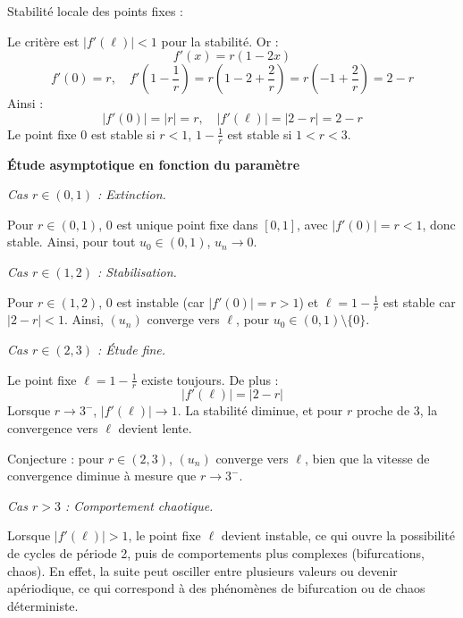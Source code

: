 \documentclass[10pt,a4paper]{article}
\begin{document}
\q Stabilité locale des points fixes :

Le critère est \( |f'(\ell)| < 1 \) pour la stabilité. Or :
\[
f'(x) = r (1 - 2x)
\]
\[
f'(0) = r, \quad f'\left(1 - \frac{1}{r}\right) = r \left(1 - 2 + \frac{2}{r}\right) = r \left( -1 + \frac{2}{r} \right) = 2 - r
\]
Ainsi :
\[
|f'(0)| = |r| = r, \quad |f'(\ell)| = |2 - r| = 2 - r
\]
Le point fixe \( 0 \) est stable si \( r < 1 \), \( 1 - \frac{1}{r} \) est stable si \( 1 < r < 3
\).

\bigskip
\textbf{Étude asymptotique en fonction du paramètre}

\textit{Cas \( r \in (0,1) \) : Extinction.}

\q Pour \( r \in (0,1) \), \( 0 \) est unique point fixe dans \( [0,1] \), avec \( |f'(0)| = r < 1
\), donc stable. Ainsi, pour tout \( u_0 \in (0,1) \), \( u_n \to 0 \).


\textit{Cas \( r \in (1,2) \) : Stabilisation.}

\q Pour \( r \in (1,2) \), \( 0 \) est instable (car \( |f'(0)| = r > 1 \)) et \( \ell = 1 -
\frac{1}{r} \) est stable car \( |2 - r| < 1 \). Ainsi, \( (u_n) \) converge vers \( \ell \), pour
\( u_0 \in (0,1) \setminus \{0\} \).


\textit{Cas \( r \in (2,3) \) : Étude fine.}

\q Le point fixe \( \ell = 1 - \frac{1}{r} \) existe toujours. De plus :
\[
|f'(\ell)| = |2 - r|
\]
Lorsque \( r \to 3^- \), \( |f'(\ell)| \to 1 \). La stabilité diminue, et pour \( r \) proche de 3,
la convergence vers \( \ell \) devient lente.

\q Conjecture : pour \( r \in (2,3) \), \( (u_n) \) converge vers \( \ell \), bien que la vitesse de
convergence diminue à mesure que \( r \to 3^- \).


\textit{Cas \( r > 3 \) : Comportement chaotique.}

\q Lorsque \( |f'(\ell)| > 1 \), le point fixe \( \ell \) devient instable, ce qui ouvre la
possibilité de cycles de période 2, puis de comportements plus complexes (bifurcations, chaos). En
effet, la suite peut osciller entre plusieurs valeurs ou devenir apériodique, ce qui correspond à
des phénomènes de bifurcation ou de chaos déterministe.
\end{document}
